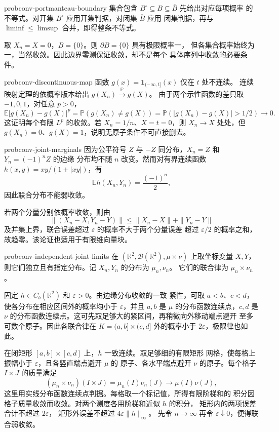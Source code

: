 \begin{solution}{probconv-portmanteau-boundary}
集合包含 $B^\circ\subseteq B\subseteq\overline B$ 先给出对应每项概率
的不等式。对开集 $B^\circ$ 应用开集判据，对闭集 $\overline B$ 应用
闭集判据，再与 $\liminf\le\limsup$ 合并，即得整条不等式。

取 $X_n=X=0$，$B=\{0\}$。则 $\partial B=\{0\}$ 具有极限概率一，
但各集合概率始终为一，当然收敛。因此边界零测保证收敛，却不是每个
具体序列中收敛的必要条件。
\end{solution}

\begin{solution}{probconv-discontinuous-map}
函数 $g(x)=\mathbf1_{(-\infty,t]}(x)$ 仅在 $t$ 处不连续。
连续映射定理的依概率版本给出 $g(X_n)\xrightarrow{\mathbb P}g(X)$。
由于两个示性函数的差只取 $-1,0,1$，对任意 $p>0$，
\[
 \mathbb E|g(X_n)-g(X)|^p
 =\mathbb P(g(X_n)\ne g(X))
 =\mathbb P(|g(X_n)-g(X)|>1/2)\longrightarrow0.
\]
这证明每个有限 $L^p$ 的收敛。若 $X_n=1/n$、$X=t=0$，则 $X_n\to X$
处处，但 $g(X_n)=0$、$g(X)=1$，说明无原子条件不可直接删去。
\end{solution}

\begin{solution}{probconv-joint-marginals}
因为公平符号 $Z$ 与 $-Z$ 同分布，$X_n=Z$ 和 $Y_n=(-1)^nZ$ 的边缘
分布均不随 $n$ 改变。然而对有界连续函数
$h(x,y)=xy/(1+|xy|)$，有
\[
 \mathbb E h(X_n,Y_n)=\frac{(-1)^n}{2},
\]
因此联合分布不能弱收敛。

若两个分量分别依概率收敛，则由
\[
 \|(X_n-X,Y_n-Y)\|\le\|X_n-X\|+\|Y_n-Y\|
\]
及并集上界，联合误差超过 $\varepsilon$ 的概率不大于两个分量误差
超过 $\varepsilon/2$ 的概率之和，故趋零。该论证也适用于有限维向量块。
\end{solution}

\begin{solution}{probconv-independent-joint-limits}
在 $(\mathbb R^2,\mathcal B(\mathbb R^2),\mu\times\nu)$ 上取坐标变量
$X,Y$，则它们独立且有指定分布。记 $X_n,Y_n$ 的分布为 $\mu_n,\nu_n$。
它们的联合律为 $\mu_n\times\nu_n$。

固定 $h\in C_b(\mathbb R^2)$ 和 $\varepsilon>0$。由边缘分布收敛的一致
紧性，可取 $a<b$、$c<d$，使各分布在相应区间外的概率均小于
$\varepsilon$，并且 $a,b$ 是 $\mu$ 的分布函数连续点，$c,d$ 是 $\nu$
的分布函数连续点。这可先取足够大的紧区间，再稍微向外移动端点避开
至多可数个原子。因此各联合律在 $K=(a,b]\times(c,d]$ 外的概率小于
$2\varepsilon$，极限律也如此。

在闭矩形 $[a,b]\times[c,d]$ 上，$h$ 一致连续。取足够细的有限矩形
网格，使每格上振幅小于 $\varepsilon$，且各竖直端点避开 $\mu$ 的
原子、各水平端点避开 $\nu$ 的原子。每个格子 $I\times J$ 的质量满足
\[
 (\mu_n\times\nu_n)(I\times J)=\mu_n(I)\nu_n(J)
 \longrightarrow\mu(I)\nu(J),
\]
这里用实线分布函数连续点判据。每格取一个标记值，所得有限阶梯和的
积分因格子质量收敛而收敛。对两个测度各用阶梯和近似 $h$ 的积分，
矩形内的两项误差合计不超过 $2\varepsilon$，
矩形外误差不超过 $4\varepsilon\|h\|_\infty$。
先令 $n\to\infty$ 再令 $\varepsilon\downarrow0$，便得联合弱收敛。
\end{solution}

